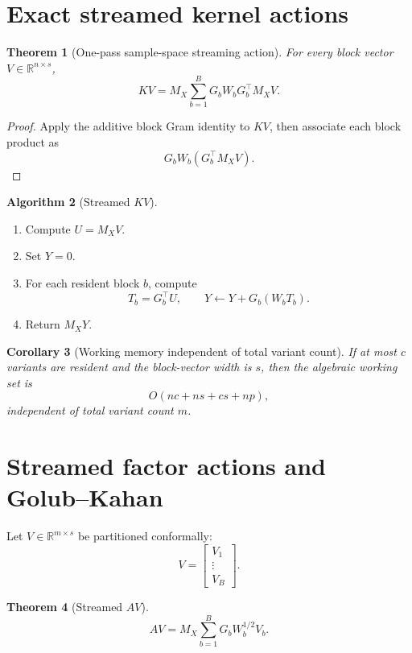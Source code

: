 \documentclass[11pt]{article}
\newtheorem{theorem}{Theorem}[section]
\newtheorem{corollary}[theorem]{Corollary}
\theoremstyle{definition}
\newtheorem{algorithm}[theorem]{Algorithm}
\theoremstyle{remark}
\begin{document}
\section{Exact streamed kernel actions}

\begin{theorem}[One-pass sample-space streaming action]
For every block vector \(V\in\mathbb R^{n\times s}\),
\[
\boxed{
KV
=
M_X
\sum_{b=1}^B
G_bW_bG_b^\top
M_XV.
}
\]
\end{theorem}

\begin{proof}
Apply the additive block Gram identity to \(KV\), then associate each block
product as
\[
G_bW_b(G_b^\top M_XV).
\]
\end{proof}

\begin{algorithm}[Streamed \(KV\)]
\begin{enumerate}[label=\arabic*.]
\item Compute \(U=M_XV\).
\item Set \(Y=0\).
\item For each resident block \(b\), compute
\[
T_b=G_b^\top U,
\qquad
Y\leftarrow Y+G_b(W_bT_b).
\]
\item Return \(M_XY\).
\end{enumerate}
\end{algorithm}

\begin{corollary}[Working memory independent of total variant count]
If at most \(c\) variants are resident and the block-vector width is \(s\),
then the algebraic working set is
\[
\boxed{
O(nc+ns+cs+np),
}
\]
independent of total variant count \(m\).
\end{corollary}

\section{Streamed factor actions and Golub--Kahan}

Let \(V\in\mathbb R^{m\times s}\) be partitioned conformally:
\[
V=
\begin{bmatrix}
V_1\\
\vdots\\
V_B
\end{bmatrix}.
\]

\begin{theorem}[Streamed \(AV\)]
\[
\boxed{
AV
=
M_X
\sum_{b=1}^B
G_bW_b^{1/2}V_b.
}
\]
\end{theorem}
\end{document}
